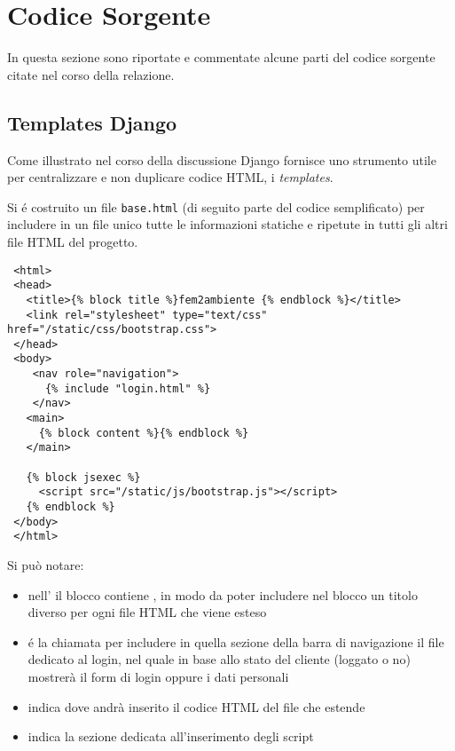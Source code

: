 \chapter{Codice Sorgente}

In questa sezione sono riportate e commentate alcune parti del codice sorgente citate nel corso della relazione.

\section*{Templates Django}
\label{app:templates}

Come illustrato nel corso della discussione Django fornisce uno strumento utile per centralizzare e non duplicare codice HTML, i \emph{templates}.

Si é costruito un file \texttt{base.html} (di seguito parte del codice semplificato) per includere in un file unico tutte le informazioni statiche e ripetute in tutti gli altri file HTML del progetto.

\begin{footnotesize}
\begin{verbatim}
 <html>
 <head>
   <title>{% block title %}fem2ambiente {% endblock %}</title>
   <link rel="stylesheet" type="text/css" href="/static/css/bootstrap.css">
 </head>
 <body>
    <nav role="navigation">                        
      {% include "login.html" %}
    </nav>   
   <main>
     {% block content %}{% endblock %}
   </main>

   {% block jsexec %}
     <script src="/static/js/bootstrap.js"></script>
   {% endblock %}
 </body>
 </html>
\end{verbatim}
\end{footnotesize}

Si può notare:
\begin{itemize}
 \item nell' il blocco  contiene , in modo da poter includere nel blocco un titolo diverso per ogni file HTML che viene esteso
 \item {} é la chiamata per includere in quella sezione della barra di navigazione il file dedicato al login, nel quale in base allo stato del cliente (loggato o no) mostrerà il form di login oppure i dati personali
 \item {} indica dove andrà inserito il codice HTML del file che estende
 \item {} indica la sezione dedicata all'inserimento degli script {\js}
\end{itemize}

